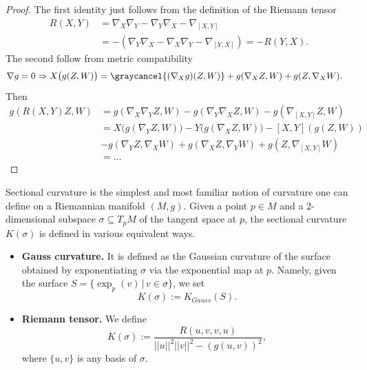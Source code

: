 \begin{proof}
The first identity just follows from the definition of the Riemann tensor 
\begin{align}
    R(X,Y) &= \nabla_X \nabla_Y - \nabla_Y \nabla_X - \nabla_{[X,Y]} \\
    & = - \left( \nabla_Y \nabla_X - \nabla_X \nabla_Y - \nabla_{[Y,X]} \right) = - R(Y,X).
\end{align}
The second follow from metric compatibility
\begin{align}
    \nabla g=0 &\Rightarrow X \big( g(Z,W) \big) = \graycancel{(\nabla_X g)(Z,W)}+ g(\nabla_X Z, W) + g(Z, \nabla_X W).
\end{align}
Then 
\begin{align}
    g(R(X,Y)Z,W) &= g(\nabla_X \nabla_Y Z, W) - g(\nabla_Y \nabla_X Z, W) - g(\nabla_{[X,Y]} Z, W)
    \\
    & = X \big( g(\nabla_Y Z, W) \big) - Y \big( g(\nabla_X Z, W) \big) - [X,Y]( g(Z, W)) \\
    & - g(\nabla_Y Z, \nabla_X W) + g(\nabla_X Z, \nabla_Y W) + g(Z, \nabla_{[X,Y]} W) \\
    & = \dots
\end{align}

\end{proof}





\begin{mytheorem}
Sectional curvature is the simplest and most familiar notion of curvature one can define on a Riemannian manifold \((M,g)\).
Given a point \(p \in M\) and a 2-dimensional subspace \(\sigma \subseteq T_p M\) of the tangent space at \(p\), the sectional curvature \(K(\sigma)\) is defined in various equivalent ways.
\begin{itemize}
    \item \textbf{Gauss curvature.}  It is defined as the Gaussian curvature of the surface obtained by exponentiating \(\sigma\) via the exponential map at \(p\).
    Namely, given the surface $S = \{\exp_p (v) \,|\, v \in \sigma \}$, we set
    \begin{equation}
        K(\sigma) := K_{Gauss} (S).
    \end{equation}
    \item \textbf{Riemann tensor.}  We define
    \begin{equation}
        K(\sigma) := \frac{R(u,v,v,u)}{||u||^2 ||v||^2 - (g(u,v))^2},
    \end{equation}
    where \(\{u,v\}\) is any basis of \(\sigma\).
\end{itemize}
\end{mytheorem}






